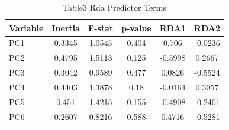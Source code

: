 
\begin{table}[htbp]
    \centering
    \small
    \caption{Table3 Rda Predictor Terms}
    \label{tab:table3_rda_predictor_terms}
    \begin{tabular}{lccccc}
        \toprule
        Variable &  Inertia & F-stat & p-value & RDA1 & RDA2 \\
        \midrule
        PC1 & 0.3345 & 1.0545 & 0.404 & 0.706 & -0.0236 \\
        PC2 & 0.4795 & 1.5113 & 0.125 & -0.5998 & 0.2667 \\
        PC3 & 0.3042 & 0.9589 & 0.477 & 0.0826 & -0.5524 \\
        PC4 & 0.4403 & 1.3878 & 0.18 & -0.0164 & 0.3057 \\
        PC5 & 0.451 & 1.4215 & 0.155 & -0.4908 & -0.2401 \\
        PC6 & 0.2607 & 0.8216 & 0.588 & 0.4716 & -0.5281 \\
        \bottomrule
    \end{tabular}
\end{table}

